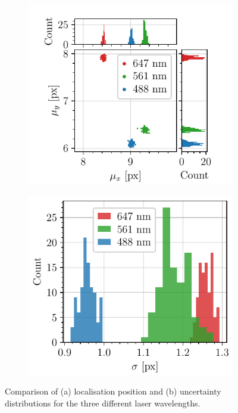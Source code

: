\begin{figure}[htbp]
    \begin{subfigure}{0.49\textwidth}
        \centering
        {\includegraphics[scale=1]{figures/comparison_mu.pdf}}
        \caption{}
        \label{fig:comparison_mu}
    \end{subfigure}
    \begin{subfigure}{0.49\textwidth}
        \centering
        {\includegraphics[scale=1]{figures/comparison_sigma.pdf}}
        \caption{}
        \label{fig:comparison_sigma}
    \end{subfigure}
    \caption{Comparison of (a) localisation position and (b) uncertainty distributions for the three different laser wavelengths.}
    \label{fig:comparison_wavelengths}
\end{figure}
